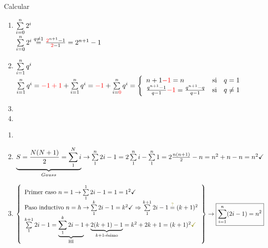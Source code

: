 \documentclass[12pt,a4paper, spanish]{article}
\begin{document}
\ejercicio Calcular \begin{enumerate}[label=\roman*)] \item $\sumatoria{i=0}{n}2^i$\\
	      $ \sumatoria{i=0}{n}2^i \stackrel{q\neq1} = \frac{\red{2}^{n+1} - 1}{\red{$2$} - 1} = 2^{n+1} - 1 $

	\item $\sumatoria{i=1}{n} q^i$\\
	      $\sumatoria{i=1}{n} q^i = \red{$-1 + 1$} + \sumatoria{i=1}{n} q^i = \red{$-1$} + \sumatoria{i = \red{$0$}}{n} q^i =
		      \llave{lll}{
			      n + 1 \red{$-1$} = n & \text{si} & q = 1\\
			      \frac{q^{n+1}-1}{q-1} \red{$-1$} = \frac{q^{n+1} - q}{q-1} & \text{si} & q \distinto 1\\
		      }$

	\item \hacer
	\item \hacer
\end{enumerate}

\ejercicio
\begin{enumerate}[label=\roman*)]
	\item
	      \hacer

	\item $\underbrace{S = \frac{N(N+1)}{2} = \sumatoria{1}{N} i }_{Gauss} \to \sumatoria{1}{n} 2i -1 = 2 \sumatoria{1}{n}i - \sumatoria{1}{n} 1 = 2 \frac{n (n+1)}{2} - n = n^2 + n -n = n^2 \checkmark $

	\item $
		      \llaves{ l }{
			      \text{Primer caso } n = 1 \to \sumatoria{1}{1} 2i -1 = 1 = 1^2 \checkmark\\
			      \text{Paso inductivo } n = h \to \sumatoria{1}{k} 2i -1 = k^2 \checkmark \entonces \sumatoria{1}{k+1} 2i -1 \stackrel{\green{?}}= (k+1)^2\\
			      \sumatoria{1}{k+1} 2i -1 = \HI{\sumatoria{1}{k} 2i -1} + \kmasuno{2(k+1) -1} = k^2 + 2k + 1 = (k+1)^2 \green{\checkmark}
		      } \to \boxed{\sumatoria{i = 1}{n} (2i - 1) = n^2}$
\end{enumerate}

\ejercicio
\hacer
\end{document}
